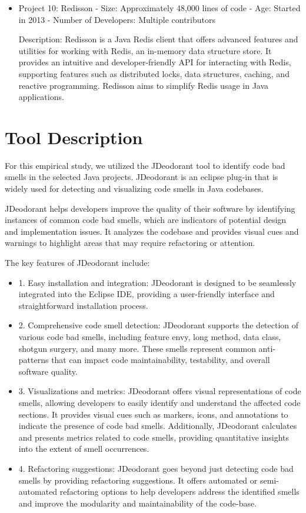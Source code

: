 \documentclass[conference]{IEEEtran}
\begin{document}
\begin{itemize}
		\item Project 10: Redisson
		- Size: Approximately 48,000 lines of code
		- Age: Started in 2013
		- Number of Developers: Multiple contributors
		
		Description: Redisson is a Java Redis client that offers advanced features and utilities for working with Redis, an in-memory data structure store. It provides an intuitive and developer-friendly API for interacting with Redis, supporting features such as distributed locks, data structures, caching, and reactive programming. Redisson aims to simplify Redis usage in Java applications.
	\end{itemize}
	
	\section{Tool Description}
	For this empirical study, we utilized the JDeodorant tool to identify code bad smells in the selected Java projects. JDeodorant is an eclipse plug-in that is widely used for detecting and visualizing code smells in Java codebases.
	
	JDeodorant helps developers improve the quality of their software by identifying instances of common code bad smells, which are indicators of potential design and implementation issues. It analyzes the codebase and provides visual cues and warnings to highlight areas that may require refactoring or attention.
	
	The key features of JDeodorant include:
	\begin{itemize}
		\item 1. Easy installation and integration: JDeodorant is designed to be seamlessly integrated into the Eclipse IDE, providing a user-friendly interface and straightforward installation process.
		
		\item 2. Comprehensive code smell detection: JDeodorant supports the detection of various code bad smells, including feature envy, long method, data class, shotgun surgery, and many more. These smells represent common anti-patterns that can impact code maintainability, testability, and overall software quality.
		
		\item 3. Visualizations and metrics: JDeodorant offers visual representations of code smells, allowing developers to easily identify and understand the affected code sections. It provides visual cues such as markers, icons, and annotations to indicate the presence of code bad smells. Additionally, JDeodorant calculates and presents metrics related to code smells, providing quantitative insights into the extent of smell occurrences.
		
		\item 4. Refactoring suggestions: JDeodorant goes beyond just detecting code bad smells by providing refactoring suggestions. It offers automated or semi-automated refactoring options to help developers address the identified smells and improve the modularity and maintainability of the code-base.
	\end{itemize}
	
\end{document}
